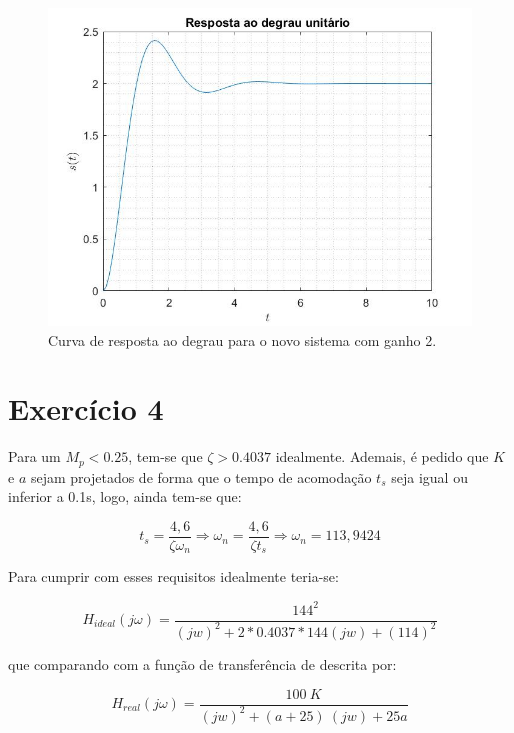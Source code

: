\documentclass[a4paper,12pt,oneside,openany,table,xcdraw]{article}
\begin{document}
\vspace{0.2cm}
\begin{figure}[H]
\centering
\includegraphics[width=14cm]{ex3-st2}
\caption{Curva de resposta ao degrau para o novo sistema com ganho 2.}
\label{ex3:st:F}
\end{figure}


\section{Exercício 4}
Para um $M_p < 0.25$, tem-se que $\zeta > 0.4037$ idealmente. Ademais, é pedido que $K$ e $a$ sejam projetados de forma que o tempo de acomodação $t_s$ seja igual ou inferior a 0.1s, logo, ainda tem-se que:

$$t_s=\dfrac{4,6}{\zeta \omega_n} \Rightarrow \omega_n=\dfrac{4,6}{\zeta t_s} \Rightarrow \omega_n = 113,9424$$
\vspace{0.3cm}

Para cumprir com esses requisitos idealmente teria-se:

\vspace{0.1cm}
\begin{equation} 
H_{ideal}(j\omega) = \dfrac{144^2}{(jw)^2 + 2 * 0.4037 *144 (jw) + (114) ^2}
\end{equation}
\vspace{0.3cm}

que comparando com a função de transferência de descrita por:

\vspace{0.2cm}
\begin{equation} 
H_{real}(j\omega) = \dfrac{100\ K}{(jw)^2 + (a+25)\ (jw) + 25a}
\end{equation}
\end{document}
